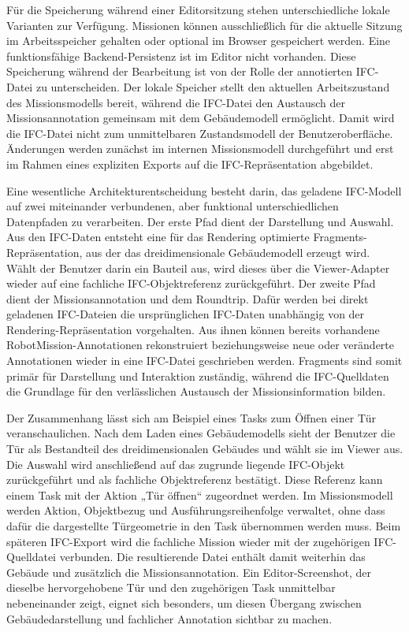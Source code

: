 Für die Speicherung während einer Editorsitzung stehen unterschiedliche lokale Varianten zur
Verfügung. Missionen können ausschließlich für die aktuelle Sitzung im Arbeitsspeicher gehalten oder
optional im Browser gespeichert werden. Eine funktionsfähige Backend-Persistenz ist im Editor
nicht vorhanden. Diese Speicherung während der Bearbeitung ist von der Rolle der annotierten
IFC-Datei zu unterscheiden. Der lokale Speicher stellt den aktuellen Arbeitszustand des
Missionsmodells bereit, während die IFC-Datei den Austausch der Missionsannotation gemeinsam mit dem
Gebäudemodell ermöglicht. Damit wird die IFC-Datei nicht zum unmittelbaren Zustandsmodell der
Benutzeroberfläche. Änderungen werden zunächst im internen Missionsmodell durchgeführt und erst im
Rahmen eines expliziten Exports auf die IFC-Repräsentation abgebildet.

Eine wesentliche Architekturentscheidung besteht darin, das geladene IFC-Modell auf zwei miteinander
verbundenen, aber funktional unterschiedlichen Datenpfaden zu verarbeiten. Der erste Pfad dient der
Darstellung und Auswahl. Aus den IFC-Daten entsteht eine für das Rendering optimierte
Fragments-Repräsentation, aus der das dreidimensionale Gebäudemodell erzeugt wird. Wählt der
Benutzer darin ein Bauteil aus, wird dieses über die Viewer-Adapter wieder auf eine fachliche
IFC-Objektreferenz zurückgeführt. Der zweite Pfad dient der Missionsannotation und dem Roundtrip.
Dafür werden bei direkt geladenen IFC-Dateien die ursprünglichen IFC-Daten unabhängig von der
Rendering-Repräsentation vorgehalten. Aus ihnen können bereits vorhandene RobotMission-Annotationen
rekonstruiert beziehungsweise neue oder veränderte Annotationen wieder in eine IFC-Datei geschrieben
werden. Fragments sind somit primär für Darstellung und Interaktion zuständig, während die
IFC-Quelldaten die Grundlage für den verlässlichen Austausch der Missionsinformation bilden.

Der Zusammenhang lässt sich am Beispiel eines Tasks zum Öffnen einer Tür veranschaulichen. Nach dem
Laden eines Gebäudemodells sieht der Benutzer die Tür als Bestandteil des dreidimensionalen Gebäudes
und wählt sie im Viewer aus. Die Auswahl wird anschließend auf das zugrunde liegende IFC-Objekt
zurückgeführt und als fachliche Objektreferenz bestätigt. Diese Referenz kann einem Task mit der
Aktion „Tür öffnen“ zugeordnet werden. Im Missionsmodell werden Aktion, Objektbezug und
Ausführungsreihenfolge verwaltet, ohne dass dafür die dargestellte Türgeometrie in den Task
übernommen werden muss. Beim späteren IFC-Export wird die fachliche Mission wieder mit der
zugehörigen IFC-Quelldatei verbunden. Die resultierende Datei enthält damit weiterhin das Gebäude
und zusätzlich die Missionsannotation. Ein Editor-Screenshot, der dieselbe hervorgehobene Tür und
den zugehörigen Task unmittelbar nebeneinander zeigt, eignet sich besonders, um diesen Übergang
zwischen Gebäudedarstellung und fachlicher Annotation sichtbar zu machen.

